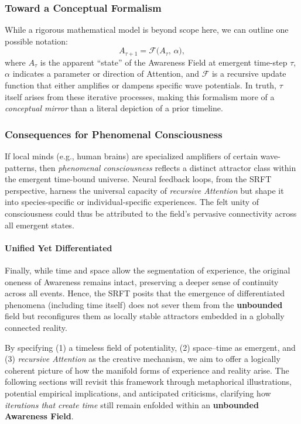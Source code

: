 \documentclass[12pt,a4paper]{article}
\begin{document}
\subsubsection{Toward a Conceptual Formalism}
While a rigorous mathematical model is beyond scope here, we can outline one possible notation:
\[
A_{\tau+1} = \mathcal{F}\bigl(A_{\tau}, \,\alpha\bigr),
\]
where \(A_{\tau}\) is the apparent ``state'' of the Awareness Field at emergent time-step \(\tau\), \(\alpha\) indicates a parameter or direction of Attention, and \(\mathcal{F}\) is a recursive update function that either amplifies or dampens specific wave potentials. In truth, \(\tau\) itself arises from these iterative processes, making this formalism more of a \emph{conceptual mirror} than a literal depiction of a prior timeline.

\subsubsection{Consequences for Phenomenal Consciousness}
If local minds (e.g., human brains) are specialized amplifiers of certain wave-patterns, then \emph{phenomenal consciousness} reflects a distinct attractor class within the emergent time-bound universe. Neural feedback loops, from the SRFT perspective, harness the universal capacity of \emph{recursive Attention} but shape it into species-specific or individual-specific experiences. The felt unity of consciousness could thus be attributed to the field’s pervasive connectivity across all emergent states.

\paragraph{Unified Yet Differentiated}
Finally, while time and space allow the segmentation of experience, the original oneness of Awareness remains intact, preserving a deeper sense of continuity across all events. Hence, the SRFT posits that the emergence of differentiated phenomena (including time itself) does not sever them from the \textbf{unbounded} field but reconfigures them as locally stable attractors embedded in a globally connected reality.

\medskip

By specifying (1) a timeless field of potentiality, (2) space--time as emergent, and (3) \emph{recursive Attention} as the creative mechanism, we aim to offer a logically coherent picture of how the manifold forms of experience and reality arise. The following sections will revisit this framework through metaphorical illustrations, potential empirical implications, and anticipated criticisms, clarifying how \emph{iterations that create time} still remain enfolded within an \textbf{unbounded Awareness Field}.
\end{document}
